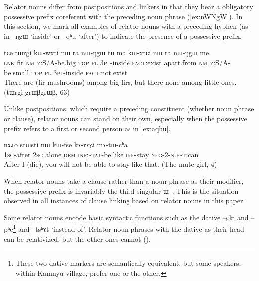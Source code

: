 \documentclass[oldfontcommands,oneside,a4paper,11pt]{article}
\newcommand{\ipa}[1]{{\phon \mbox{#1}}} %
\begin{document}
Relator nouns differ from postpositions and linkers in that they bear a obligatory possessive prefix coreferent with the preceding    noun phrase (\ref{ex:nWNgW}). In this section, we mark all examples of relator nouns with a preceding hyphen (as in \ipa{--ŋgɯ} `inside' or \ipa{--qʰu} `after') to indicate the  presence of a possessive prefix.

 \begin{exe}
\ex \label{ex:nWNgW} 
\gll  
\ipa{tɕe}  	\ipa{tɯrgi}  	\ipa{kɯ-wxti}  	\ipa{nɯ} \ipa{ra}  	\ipa{nɯ-ŋgɯ}  	\ipa{tu}  	\ipa{ma}  	\ipa{kɯ-xtɕi}  	\ipa{nɯ} \ipa{ra}  	\ipa{nɯ-ŋgɯ}  	\ipa{me.}  \\
\textsc{lnk} fir \textsc{nmlz}:S/A-be.big \textsc{top} \textsc{pl} \textsc{3pl}-inside \textsc{fact}:exist apart.from \textsc{nmlz:S/A}-be.small  \textsc{top} \textsc{pl} \textsc{3pl}-inside  \textsc{fact}:not.exist \\
\glt There are (fir mushrooms) among big firs, but there none among little ones. (tɯrgi grɯβgrɯβ, 63)
\end{exe}


Unlike postpositions, which require a preceding constituent (whether noun phrase or clause), relator nouns can stand on their own, especially when the possessive prefix refers to a first or second person as in \ref{ex:aqhu}.

 \begin{exe}
\ex \label{ex:aqhu} 
\gll  \ipa{a-qʰu}  	\ipa{nɤʑo}  	\ipa{stɯsti}  	\ipa{nɯ}  	\ipa{kɯ-fse}  	\ipa{kɤ-rɤʑi}  	\ipa{mɤ-tɯ-cʰa}  \\
\textsc{1sg}-after \textsc{2sg} alone \textsc{dem} \textsc{inf:stat}-be.like \textsc{inf}-stay \textsc{neg-2-n.pst}:can \\
\glt After I (die), you will not be able to stay like that. (The mute girl, 4)
\end{exe}

When relator nouns take a clause  rather than a noun phrase as their modifier, the possessive prefix is invariably the third singular \ipa{ɯ--}. This is the situation observed in all instances of clause linking based on relator nouns in this paper.



Some relator nouns encode basic syntactic functions such as the dative \ipa{--ɕki} and \ipa{--pʰe}\footnote{These two dative markers are semantically equivalent, but some speakers, within Kamnyu village, prefer one or the other.} and \ipa{--tsʰɤt} `instead of'.   Relator noun phrases with the dative as their head can be relativized, but the other ones cannot (\citealt{jacques14relatives}).
\end{document}

